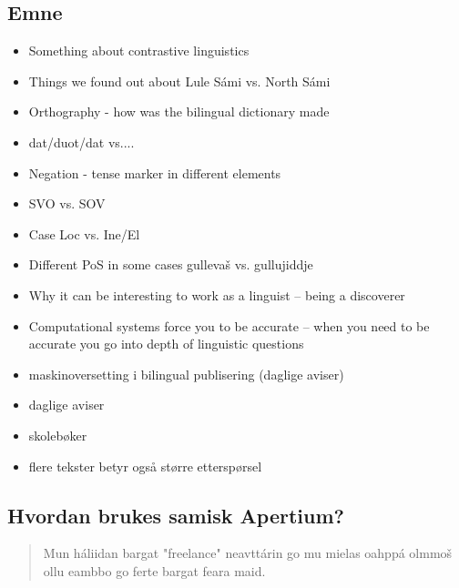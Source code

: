 \documentclass[a4paper,english,12pt]{article}
\begin{document}
\begin{spacing}{1.0}
\subsection{Emne}
\begin{itemize}
\item Something about contrastive linguistics  
\item Things we found out about Lule Sámi vs. North Sámi  
\item Orthography - how was the bilingual dictionary made  
\item dat/duot/dat vs.... 
\item Negation - tense marker in different elements  
\item SVO vs. SOV  
\item Case Loc vs. Ine/El  
\item Different PoS in some cases gullevaš vs. gullujiddje  
\item Why it can be interesting to work as a linguist -- being a discoverer  
\item Computational systems force you to be accurate -- when you need to be accurate you go into depth of linguistic questions
\end{itemize} 


\begin{itemize}
\item maskinoversetting i bilingual publisering (daglige aviser)
\item daglige aviser
\item skolebøker
\item flere tekster betyr også større etterspørsel
\end{itemize}

\subsection{Hvordan brukes samisk Apertium?}

\begin{quote}
Mun háliidan bargat "freelance" neavttárin go mu mielas oahppá olmmoš ollu eambbo go ferte bargat feara maid.
\end{quote}



\end{spacing}
\end{document}
